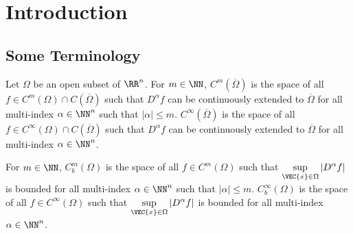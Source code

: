 \chapter{Introduction}

\section{Some Terminology}

Let $\Omega$ be an open subset of $\RR^n$.  For $m\in \NN$,
$C^m(\overline{\Omega})$ is the space of all
$f \in C^m(\Omega) \cap C(\overline{\Omega})$ such that
$D^\alpha f$ can be continuously extended to $\overline{\Omega}$ for
all multi-index $\alpha \in \NN^n$ such that $|\alpha|\leq m$.
$C^\infty(\overline{\Omega})$ is the space of all
$f \in C^\infty(\Omega) \cap C(\overline{\Omega})$ such that
$D^\alpha f$ can be continuously extended to $\overline{\Omega}$ for
all multi-index $\alpha \in \NN^n$.

For $m\in \NN$, $C^m_b(\Omega)$ is the space of all
$f \in C^m(\Omega)$ such that
$\displaystyle \sup_{\VEC{x}\in\Omega} |D^\alpha f|$
is bounded for all multi-index $\alpha \in \NN^n$ such that
$|\alpha|\leq m$.  $C^\infty_b(\Omega)$ is the space of all
$f \in C^\infty(\Omega)$ such that
$\displaystyle \sup_{\VEC{x}\in\Omega} |D^\alpha f|$ is bounded for all
multi-index $\alpha \in \NN^n$.


